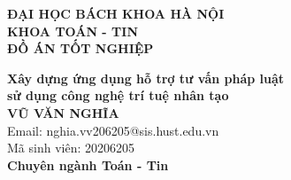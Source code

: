 \begin{titlepage}
\thispagestyle{empty}
\begin{center}

{\textbf{\large{ĐẠI HỌC BÁCH KHOA HÀ NỘI}}}\\
{\textbf{\large{KHOA TOÁN - TIN}}}\\[5cm]

{\textbf{\huge{ĐỒ ÁN TỐT NGHIỆP}}}\\[1cm]
{\textbf{\Large{Xây dựng ứng dụng hỗ trợ tư vấn pháp luật \\ sử dụng công nghệ trí tuệ nhân tạo}}\\[1cm]

{\textbf{\large{VŨ VĂN NGHĨA}}}\\
{\large{Email: nghia.vv206205@sis.hust.edu.vn}}\\
{\large{Mã sinh viên: 20206205}}\\[0.5cm]

{\textbf{\large{Chuyên ngành Toán - Tin}}}\\

\vspace{4cm}
\begin{table}[H]
\centering
{}
\end{table}}
\end{center}

\end{titlepage}
